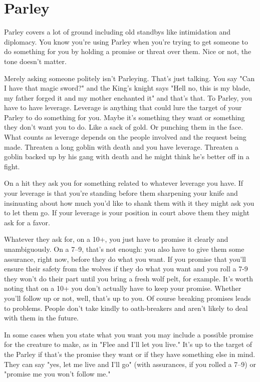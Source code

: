 \section{Parley}   
 

Parley covers a lot of ground including old standbys like intimidation and diplomacy. You know you're using Parley when you're trying to get someone to do something for you by holding a promise or threat over them. Nice or not, the tone doesn't matter.

 

Merely asking someone politely isn't Parleying. That's just talking. You say "Can I have that magic sword?" and the King's knight says "Hell no, this is my blade, my father forged it and my mother enchanted it" and that's that. To Parley, you have to have leverage. Leverage is anything that could lure the target of your Parley to do something for you. Maybe it's something they want or something they don't want you to do. Like a sack of gold. Or punching them in the face. What counts as leverage depends on the people involved and the request being made. Threaten a long goblin with death and you have leverage. Threaten a goblin backed up by his gang with death and he might think he's better off in a fight.

 

On a hit they ask you for something related to whatever leverage you have. If your leverage is that you're standing before them sharpening your knife and insinuating about how much you'd like to shank them with it they might ask you to let them go. If your leverage is your position in court above them they might ask for a favor.

 

Whatever they ask for, on a 10+, you just have to promise it clearly and unambiguously. On a 7–9, that's not enough: you also have to give them some assurance, right now, before they do what you want. If you promise that you'll ensure their safety from the wolves if they do what you want and you roll a 7-9 they won't do their part until you bring a fresh wolf pelt, for example. It's worth noting that on a 10+ you don't actually have to keep your promise. Whether you'll follow up or not, well, that's up to you. Of course breaking promises leads to problems. People don't take kindly to oath-breakers and aren't likely to deal with them in the future.

 

In some cases when you state what you want you may include a possible promise for the creature to make, as in "Flee and I'll let you live." It's up to the target of the Parley if that's the promise they want or if they have something else in mind. They can say "yes, let me live and I'll go" (with assurances, if you rolled a 7–9) or "promise me you won't follow me."

